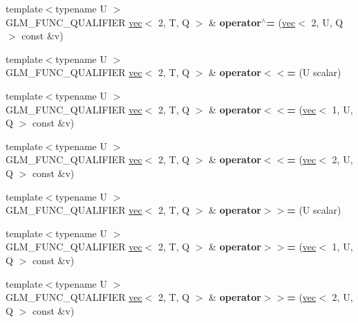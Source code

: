 \begin{DoxyCompactItemize}
{\footnotesize template$<$typename U $>$ }\\G\+L\+M\+\_\+\+F\+U\+N\+C\+\_\+\+Q\+U\+A\+L\+I\+F\+I\+ER \hyperlink{structglm_1_1vec}{vec}$<$ 2, T, Q $>$ \& {\bfseries operator$^\wedge$=} (\hyperlink{structglm_1_1vec}{vec}$<$ 2, U, Q $>$ const \&v)
\item 
\mbox{\label{structglm_1_1vec_3_012_00_01T_00_01Q_01_4_ace47fc51a0a40c12d24193c4ff6ac8ae}} 
{\footnotesize template$<$typename U $>$ }\\G\+L\+M\+\_\+\+F\+U\+N\+C\+\_\+\+Q\+U\+A\+L\+I\+F\+I\+ER \hyperlink{structglm_1_1vec}{vec}$<$ 2, T, Q $>$ \& {\bfseries operator$<$$<$=} (U scalar)
\item 
\mbox{\label{structglm_1_1vec_3_012_00_01T_00_01Q_01_4_a4423f3d6021ce069241999d4e7829c9d}} 
{\footnotesize template$<$typename U $>$ }\\G\+L\+M\+\_\+\+F\+U\+N\+C\+\_\+\+Q\+U\+A\+L\+I\+F\+I\+ER \hyperlink{structglm_1_1vec}{vec}$<$ 2, T, Q $>$ \& {\bfseries operator$<$$<$=} (\hyperlink{structglm_1_1vec}{vec}$<$ 1, U, Q $>$ const \&v)
\item 
\mbox{\label{structglm_1_1vec_3_012_00_01T_00_01Q_01_4_a3bbdd09fd3976b858078dc1157cecf19}} 
{\footnotesize template$<$typename U $>$ }\\G\+L\+M\+\_\+\+F\+U\+N\+C\+\_\+\+Q\+U\+A\+L\+I\+F\+I\+ER \hyperlink{structglm_1_1vec}{vec}$<$ 2, T, Q $>$ \& {\bfseries operator$<$$<$=} (\hyperlink{structglm_1_1vec}{vec}$<$ 2, U, Q $>$ const \&v)
\item 
\mbox{\label{structglm_1_1vec_3_012_00_01T_00_01Q_01_4_aece22b772eb31903dd637c069c2aee82}} 
{\footnotesize template$<$typename U $>$ }\\G\+L\+M\+\_\+\+F\+U\+N\+C\+\_\+\+Q\+U\+A\+L\+I\+F\+I\+ER \hyperlink{structglm_1_1vec}{vec}$<$ 2, T, Q $>$ \& {\bfseries operator$>$$>$=} (U scalar)
\item 
\mbox{\label{structglm_1_1vec_3_012_00_01T_00_01Q_01_4_a9831eed973635e3d4cea367592355f63}} 
{\footnotesize template$<$typename U $>$ }\\G\+L\+M\+\_\+\+F\+U\+N\+C\+\_\+\+Q\+U\+A\+L\+I\+F\+I\+ER \hyperlink{structglm_1_1vec}{vec}$<$ 2, T, Q $>$ \& {\bfseries operator$>$$>$=} (\hyperlink{structglm_1_1vec}{vec}$<$ 1, U, Q $>$ const \&v)
\item 
\mbox{\label{structglm_1_1vec_3_012_00_01T_00_01Q_01_4_a7ef73d8384eeb47fd2a2afbd897cb06a}} 
{\footnotesize template$<$typename U $>$ }\\G\+L\+M\+\_\+\+F\+U\+N\+C\+\_\+\+Q\+U\+A\+L\+I\+F\+I\+ER \hyperlink{structglm_1_1vec}{vec}$<$ 2, T, Q $>$ \& {\bfseries operator$>$$>$=} (\hyperlink{structglm_1_1vec}{vec}$<$ 2, U, Q $>$ const \&v)
\end{DoxyCompactItemize}
